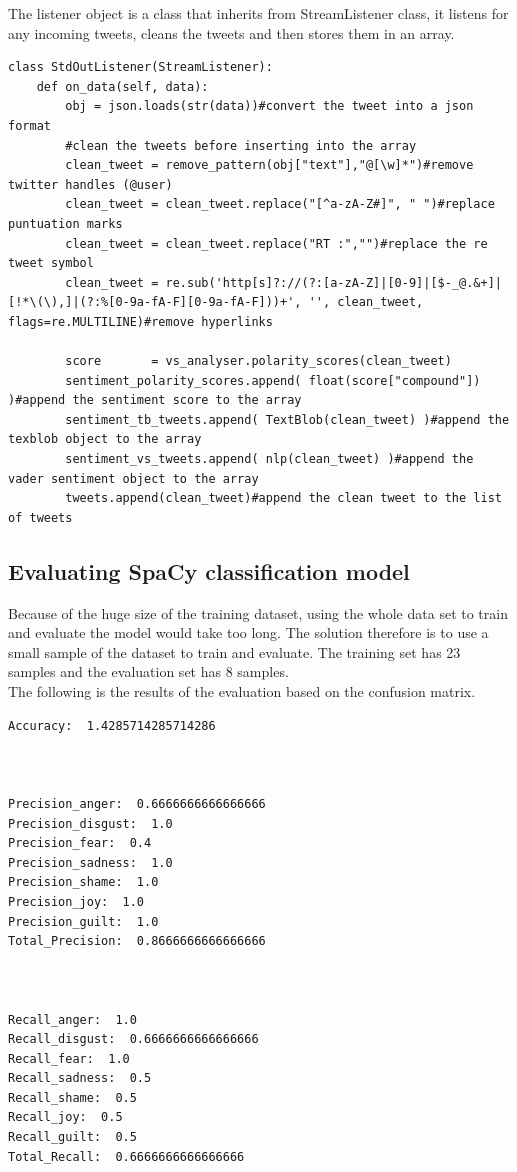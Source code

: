 The listener object is a class that inherits from StreamListener class, it listens for any incoming tweets, cleans the tweets and then stores them in an array.

\begin{lstlisting}
class StdOutListener(StreamListener):
    def on_data(self, data):
        obj = json.loads(str(data))#convert the tweet into a json format
        #clean the tweets before inserting into the array
        clean_tweet = remove_pattern(obj["text"],"@[\w]*")#remove twitter handles (@user)
        clean_tweet = clean_tweet.replace("[^a-zA-Z#]", " ")#replace puntuation marks
        clean_tweet = clean_tweet.replace("RT :","")#replace the re tweet symbol
        clean_tweet = re.sub('http[s]?://(?:[a-zA-Z]|[0-9]|[$-_@.&+]|[!*\(\),]|(?:%[0-9a-fA-F][0-9a-fA-F]))+', '', clean_tweet, flags=re.MULTILINE)#remove hyperlinks
        
        score       = vs_analyser.polarity_scores(clean_tweet)
        sentiment_polarity_scores.append( float(score["compound"]) )#append the sentiment score to the array
        sentiment_tb_tweets.append( TextBlob(clean_tweet) )#append the texblob object to the array
        sentiment_vs_tweets.append( nlp(clean_tweet) )#append the vader sentiment object to the array
        tweets.append(clean_tweet)#append the clean tweet to the list of tweets
\end{lstlisting}



\subsection{Evaluating SpaCy classification model}
Because of the huge size of the training dataset, using the whole data set to train and evaluate the model would take too long. The solution therefore is to use a small sample of the dataset to train and evaluate.
The training set has 23 samples and the evaluation set has 8 samples.\\
The following is the results of the evaluation based on the confusion matrix.

\begin{lstlisting}
Accuracy:  1.4285714285714286



Precision_anger:  0.6666666666666666
Precision_disgust:  1.0
Precision_fear:  0.4
Precision_sadness:  1.0
Precision_shame:  1.0
Precision_joy:  1.0
Precision_guilt:  1.0
Total_Precision:  0.8666666666666666



Recall_anger:  1.0
Recall_disgust:  0.6666666666666666
Recall_fear:  1.0
Recall_sadness:  0.5
Recall_shame:  0.5
Recall_joy:  0.5
Recall_guilt:  0.5
Total_Recall:  0.6666666666666666
\end{lstlisting}

